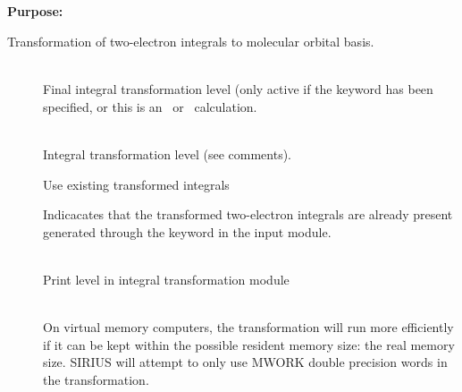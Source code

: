  
\pagebreak[3]
\subsection{\label{ref-trainp}}
 
{\bf Purpose:}
 
Transformation of two-electron
integrals to molecular orbital
basis. 
 
\begin{description}
\item[]
   \\
  Final integral transformation level (only active if the keyword
   has been specified, or this is an \aba\ or
  \resp\ calculation.
 
\item[]
   \\
  Integral transformation level (see comments).
 
\item[]
  Use existing transformed integrals

\item[]
Indicacates that the transformed two-electron integrals are already
present generated through the keyword  in the
 input module. 

\item[]
   \\
  Print level in integral transformation module
 
\item[]
   \\
  On virtual memory computers, the transformation will run more
  efficiently if it can be kept within the possible resident memory
  size: the real memory size.  SIRIUS will attempt to only use MWORK
  double precision words in the transformation.
\end{description}
 
 
 
